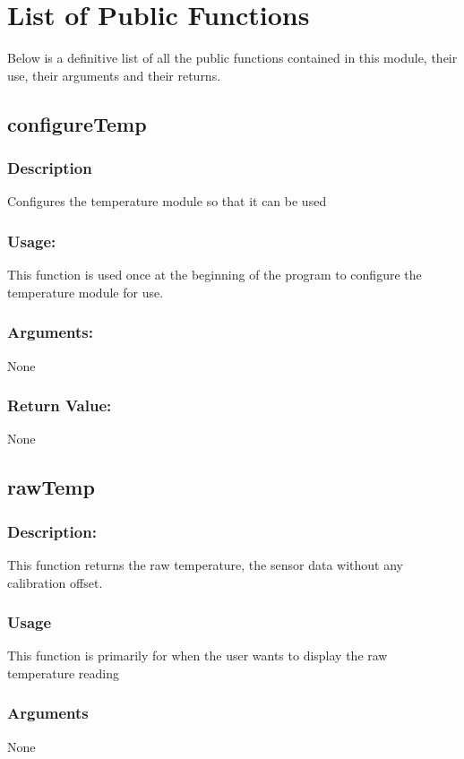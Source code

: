 \documentclass[]{report}
\begin{document}
\section{List of Public Functions}
Below is a definitive list of all the public functions contained in this module, their use, their arguments and their returns.

\subsection{configureTemp}
\subsubsection{Description}
Configures the temperature module so that it can be used

\subsubsection{Usage:}
This function is used once at the beginning of the program to configure the temperature module for use.

\subsubsection{Arguments:}
None

\subsubsection{Return Value:}
None

\subsection{rawTemp}
\subsubsection{Description:}
This function returns the raw temperature, the sensor data without any calibration offset.

\subsubsection{Usage}
This function is primarily for when the user wants to display the raw temperature reading

\subsubsection{Arguments}
None
\end{document}
